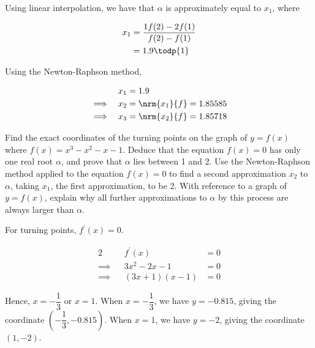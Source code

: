 \documentclass{jhwhw}
\begin{document}

            Using linear interpolation, we have that $\alpha$ is approximately equal to $x_1$, where

            \begin{equation*}
                \begin{aligned}
                    x_1 &= \dfrac{1f(2) - 2f(1)}{f(2) - f(1)} \\
                    &= 1.9 \todp{1}
                \end{aligned}
            \end{equation*}


            Using the Newton-Raphson method, 

            \begin{alignat*}{2}
                && x_1 &= 1.9 \\
                \implies&&x_2 &= \nrm{x_1}{f} = 1.85585 \\
                \implies&&x_3 &= \nrm{x_2}{f} = 1.85718
            \end{alignat*}


    \problem{}
        Find the exact coordinates of the turning points on the graph of $y = f(x)$ where $f(x) = x^3-x^2-x-1$. Deduce that the equation $f(x) = 0$ has only one real root $\alpha$, and prove that $\alpha$ lies between 1 and 2. Use the Newton-Raphson method applied to the equation $f(x) = 0$ to find a second approximation $x_2$ to $\alpha$, taking $x_1$, the first approximation, to be 2. With reference to a graph of $y=f(x)$, explain why all further approximations to $\alpha$ by this process are always larger than $\alpha$.

    \solution
        For turning points, $f^\prime(x) = 0$.

        \begin{alignat*}{2}
            &&f^\prime(x) &= 0 \\
            \implies&& 3x^2-2x-1 &= 0\\
            \implies&& (3x+1)(x-1) &= 0
        \end{alignat*}

        Hence, $x = -\dfrac13$ or $x = 1$. When $x = -\dfrac13$, we have $y = -0.815$, giving the coordinate $(-\dfrac13, -0.815)$. When $x = 1$, we have $y = -2$, giving the coordinate $(1, -2)$.
\end{document}
